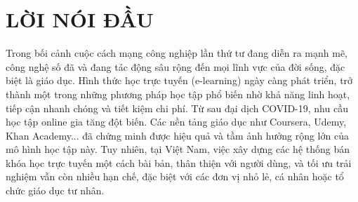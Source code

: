 \documentclass{article}
\begin{document}
	\section*{LỜI NÓI ĐẦU}
	\thispagestyle{empty}
	Trong bối cảnh cuộc cách mạng công nghiệp lần thứ tư đang diễn ra mạnh mẽ, công nghệ số đã và đang tác động sâu rộng đến mọi lĩnh vực của đời sống, đặc biệt là giáo dục. Hình thức học trực tuyến (e-learning) ngày càng phát triển, trở thành một trong những phương pháp học tập phổ biến nhờ khả năng linh hoạt, tiếp cận nhanh chóng và tiết kiệm chi phí. Từ sau đại dịch COVID-19, nhu cầu học tập online gia tăng đột biến. Các nền tảng giáo dục như Coursera, Udemy, Khan Academy... đã chứng minh được hiệu quả và tầm ảnh hưởng rộng lớn của mô hình học tập này. Tuy nhiên, tại Việt Nam, việc xây dựng các hệ thống bán khóa học trực tuyến một cách bài bản, thân thiện với người dùng, và tối ưu trải nghiệm vẫn còn nhiều hạn chế, đặc biệt với các đơn vị nhỏ lẻ, cá nhân hoặc tổ chức giáo dục tư nhân.
	\cleardoublepage
\end{document}
